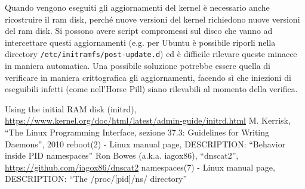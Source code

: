 \documentclass{article}
\begin{document}
Quando vengono eseguiti gli aggiornamenti del kernel è necessario anche ricostruire il ram disk, perché nuove versioni del kernel richiedono nuove versioni del ram disk. Si possono avere script compromessi sul disco che vanno ad intercettare questi aggiornamenti (e.g. per Ubuntu è possibile riporli nella directory \texttt{/etc/initramfs/post-update.d}) ed è difficile rilevare queste minacce in maniera automatica. Una possibile soluzione potrebbe essere quella di verificare in maniera crittografica gli aggiornamenti, facendo sì che iniezioni di eseguibili infetti (come nell'Horse Pill) siano rilevabili al momento della verifica.

\begin{thebibliography}{9}
	{\sc Using the initial RAM disk (initrd),}
	\url{https://www.kernel.org/doc/html/latest/admin-guide/initrd.html}
	{\sc M. Kerrisk,}
	``The Linux Programming Interface, sezione 37.3: Guidelines for Writing Daemons'', 2010
	{\sc reboot(2) - Linux manual page,}
	DESCRIPTION: ``Behavior inside PID namespaces''
	{\sc Ron Bowes (a.k.a. iagox86),}
	``dnscat2'', \url{https://github.com/iagox86/dnscat2}
	{\sc namespaces(7) - Linux manual page,}
	DESCRIPTION: ``The /proc/[pid]/ns/ directory''
\end{thebibliography}
\end{document}
